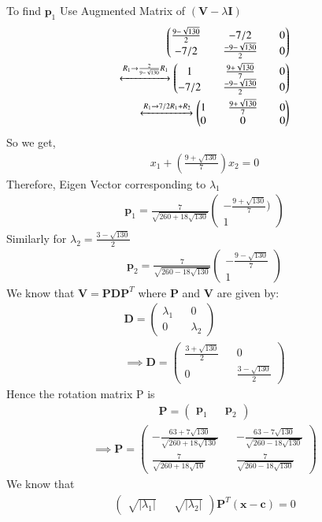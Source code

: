 \documentclass[journal,13pt,twocolumn]{IEEEtran}
\newcommand{\myvec}[1]{\ensuremath{\begin{pmatrix}#1\end{pmatrix}}}
\renewcommand{\vec}[1]{\mathbf{#1}}
\begin{document}
To find $ \vec{p}_1 $ Use Augmented Matrix of $(\vec{V} - \lambda \vec{I})$
\begin{equation}
\begin{split}
 \myvec{\frac{9-\sqrt{130}}{2} && -7/2 && 0\\ -7/2 && \frac{-9-\sqrt{130}}{2} && 0}\\
\xleftrightarrow[]{R_1\rightarrow \frac{2}{9-\sqrt{130}}R_1} 
\myvec{1 && \frac{9+\sqrt{130}}{7} && 0\\ -7/2 && \frac{-9-\sqrt{130}}{2} && 0}\\
\xleftrightarrow[]{R_1\rightarrow 7/2R_1+R_2} 
\myvec{1 && \frac{9+\sqrt{130}}{7} && 0\\ 0 && 0 && 0} 
\end{split}
\end{equation}
So we get,
\begin{align}
x_1 + (\frac{9+\sqrt{130}}{7})x_2 = 0
\end{align}
Therefore, Eigen Vector corresponding to $\lambda_1$
\begin{align}
\vec{p}_1 =\frac{7}{\sqrt{260+18\sqrt{130}}} \myvec{-\frac{9+\sqrt{130}}{7}) \\ 1}
\end{align}
Similarly for $\lambda_2 = \frac{3-\sqrt{130}}{2}$
\begin{align}
\vec{p}_2 =\frac{7}{\sqrt{260-18\sqrt{130}}} \myvec{-\frac{9-\sqrt{130}}{7} \\ 1}
\end{align}
We know that $\vec{V} = \vec{P}\vec{D}\vec{P}^T$ where $\vec{P}$ and $\vec{V}$ are given by:
\begin{align}
\vec{D} = \myvec{\lambda_1 && 0\\ 0 && \lambda_2}\\
\implies \vec{D} = \myvec{\frac{3+\sqrt{130}}{2} && 0\\ 0 &&\frac{3-\sqrt{130}}{2} }
\end{align}
Hence the rotation matrix P is
\begin{align}
\vec{P} = \myvec{\vec{p}_1 && \vec{p}_2}
\end{align}
\begin{align}
\implies \vec{P} = \myvec{-\frac{63+7\sqrt{130}}{\sqrt{260+18\sqrt{130}}} && -\frac{63-7\sqrt{130}}{\sqrt{260-18\sqrt{130}}} \\ \frac{7}{\sqrt{260+18\sqrt{10}}} && \frac{7}{\sqrt{260-18\sqrt{130}}}}
\end{align}
We know that 
\begin{align}
\myvec{\sqrt{|\lambda_1|} && \sqrt{|\lambda_2|}}\vec{P}^T(\vec{x}-\vec{c}) = 0
\end{align}
\end{document}
